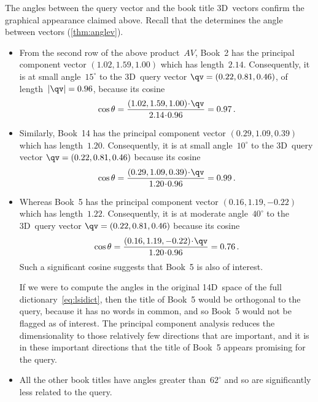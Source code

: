 The angles between the query vector and the book title 3D~vectors confirm the graphical appearance claimed above.
Recall that the  determines the angle between vectors (\autoref{thm:anglev}).
\begin{itemize}
\item From the second row of the above product~\(AV\), Book~2 has the principal component vector \((1.02,1.59,1.00)\) which has length~\(2.14\).
Consequently, it is at small angle~\(15^\circ\) to the 3D~query vector \(\qv=(0.22,0.81,0.46)\), of length~\(|\qv|=0.96\), because its cosine
\begin{equation*}
\cos\theta=\frac{(1.02,1.59,1.00)\cdot\qv}{2.14\cdot0.96}
=0.97\,.
\end{equation*}

\item Similarly, Book~14 has the principal component vector \((0.29,1.09,0.39)\) which has length~\(1.20\).
Consequently, it is at small angle~\(10^\circ\) to the 3D~query vector \(\qv=(0.22,0.81,0.46)\) because its cosine
\begin{equation*}
\cos\theta=\frac{(0.29,1.09,0.39)\cdot\qv}{1.20\cdot0.96}
=0.99\,.
\end{equation*}

\item Whereas Book~5 has the principal component vector \((0.16,1.19,-0.22)\) which has length~\(1.22\).
Consequently, it is at moderate angle~\(40^\circ\) to the 3D~query vector \(\qv=(0.22,0.81,0.46)\) because its cosine
\begin{equation*}
\cos\theta=\frac{(0.16,1.19,-0.22)\cdot\qv}{1.20\cdot0.96}
=0.76\,.
\end{equation*}
Such a significant cosine suggests that Book~5 is also of interest.

If we were to compute the angles in the original 14D~space of the full dictionary~\eqref{eq:lsidict}, then the title of Book~5 would be orthogonal to the query, because it has no words in common, and so Book~5 would not be flagged as of interest.
The principal component analysis reduces the dimensionality to those relatively few directions that are important, and it is in these important directions that the title of Book~5 appears promising for the query.

\item All the other book titles have angles greater than~\(62^\circ\) and so are significantly less related to the query.
\end{itemize}



